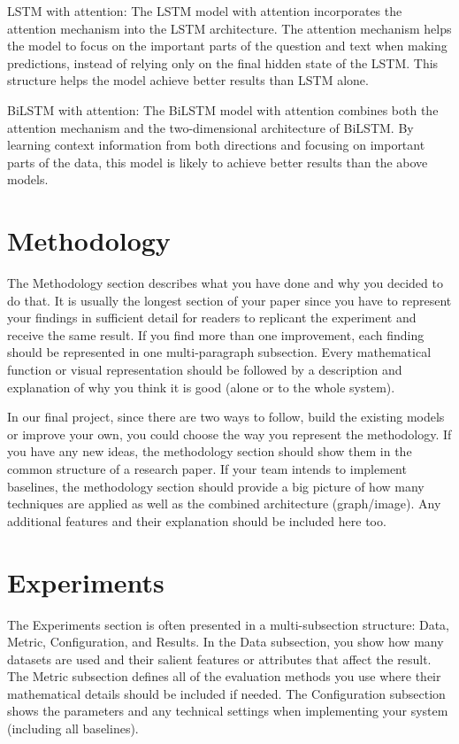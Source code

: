 \documentclass[11pt]{article}
\begin{document}
LSTM with attention: The LSTM model with attention incorporates the attention mechanism into the LSTM architecture. The attention mechanism helps the model to focus on the important parts of the question and text when making predictions, instead of relying only on the final hidden state of the LSTM. This structure helps the model achieve better results than LSTM alone.

BiLSTM with attention: The BiLSTM model with attention combines both the attention mechanism and the two-dimensional architecture of BiLSTM. By learning context information from both directions and focusing on important parts of the data, this model is likely to achieve better results than the above models.

\section{Methodology}
The Methodology section describes what you have done and why you decided to do that.
It is usually the longest section of your paper since you have to represent your findings in sufficient detail for readers to replicant the experiment and receive the same result.
If you find more than one improvement, each finding should be represented in one multi-paragraph subsection. 
Every mathematical function or visual representation should be followed by a description and explanation of why you think it is good (alone or to the whole system).

In our final project, since there are two ways to follow, build the existing models or improve your own, you could choose the way you represent the methodology.
If you have any new ideas, the methodology section should show them in the common structure of a research paper.
If your team intends to implement baselines, the methodology section should provide a big picture of how many techniques are applied as well as the combined architecture (graph/image).
Any additional features and their explanation should be included here too.

\section{Experiments}
The Experiments section is often presented in a multi-subsection structure: Data, Metric, Configuration, and Results.
In the Data subsection, you show how many datasets are used and their salient features or attributes that affect the result.
The Metric subsection defines all of the evaluation methods you use where their mathematical details should be included if needed.
The Configuration subsection shows the parameters and any technical settings when implementing your system (including all baselines).
\end{document}
